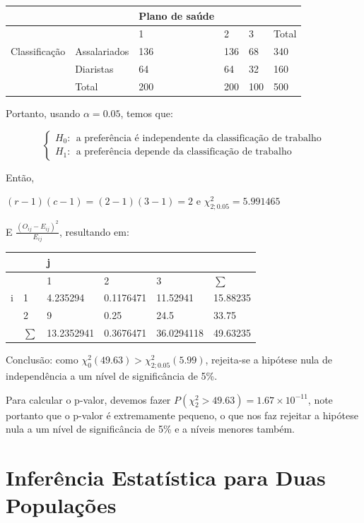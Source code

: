 \documentclass[
]{book}
\begin{document}
\begin{longtable}[]{@{}llllll@{}}
\toprule
& & Plano de saúde & & & \\
\midrule
\endhead
& & 1 & 2 & 3 & Total \\
Classificação & Assalariados & 136 & 136 & 68 & 340 \\
& Diaristas & 64 & 64 & 32 & 160 \\
& Total & 200 & 200 & 100 & 500 \\
\bottomrule
\end{longtable}

Portanto, usando \(\alpha=0.05\), temos que:

\[
\begin{cases}
H_0:~~\text{a preferência é independente da classificação de trabalho}\\
H_1:~~\text{a preferência depende da classificação de trabalho}
\end{cases}
\]

Então,

\((r-1)(c-1)=(2-1)(3-1)=2\) e \(\chi^2_{2;0.05}=5.991465\)

E \(\frac{(O_{ij}-E_{ij})^2}{E_{ij}}\), resultando em:

\begin{longtable}[]{@{}llllll@{}}
\toprule
& & j & & & \\
\midrule
\endhead
& & 1 & 2 & 3 & \(\sum\) \\
i & 1 & 4.235294 & 0.1176471 & 11.52941 & 15.88235 \\
& 2 & 9 & 0.25 & 24.5 & 33.75 \\
& \(\sum\) & 13.2352941 & 0.3676471 & 36.0294118 & 49.63235 \\
\bottomrule
\end{longtable}

Conclusão: como \(\chi^2_0(49.63)>\chi^2_{2;0.05}(5.99)\), rejeita-se a hipótese nula de independência a um nível de significância de 5\%.

Para calcular o p-valor, devemos fazer \(P(\chi_2^2>49.63)=1.67\times 10^{-11}\), note portanto que o p-valor é extremamente pequeno, o que nos faz rejeitar a hipótese nula a um nível de significância de 5\% e a níveis menores também.

\hypertarget{inferuxeancia-estatuxedstica-para-duas-populauxe7uxf5es}{%
\chapter{Inferência Estatística para Duas Populações}\label{inferuxeancia-estatuxedstica-para-duas-populauxe7uxf5es}}
\end{document}
